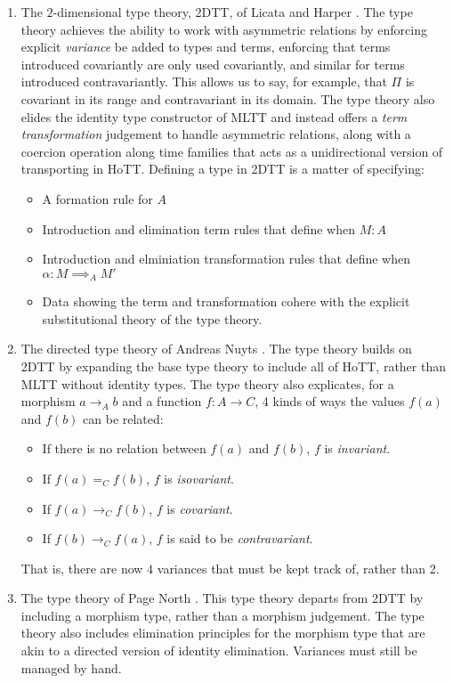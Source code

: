 \documentclass[main.tex]{subfiles}
\begin{document}
\begin{enumerate}
	\item The $2$-dimensional type theory, 2DTT, of Licata and Harper \cite{2DTT_Licata_Harper}. The type theory achieves the ability to work with asymmetric relations by enforcing explicit \textit{variance} be added to types and terms, enforcing that terms introduced covariantly are only used covariantly, and similar for terms introduced contravariantly. This allows us to say, for example, that $\Pi$ is covariant in its range and contravariant in its domain. The type theory also elides the identity type constructor of MLTT and instead offers a \textit{term transformation} judgement to handle asymmetric relations, along with a coercion operation along time families that acts as a unidirectional version of transporting in HoTT. Defining a type in 2DTT is a matter of specifying:
	\begin{itemize}
		\item A formation rule for $A$
		\item Introduction and elimination term rules that define when $M : A$
		\item Introduction and elminiation transformation rules that define when $\alpha : M \implies_A M'$
		\item Data showing the term and transformation cohere with the explicit substitutional theory of the type theory.
	\end{itemize}
	\item The directed type theory of Andreas Nuyts \cite{nuyts2015towards}. The type theory builds on 2DTT by expanding the base type theory to include all of HoTT, rather than MLTT without identity types. The type theory also explicates, for a morphism $a \to_A b$ and a function $f : A \to C$, 4 kinds of ways the values $f(a)$ and $f(b)$ can be related:
	\begin{itemize}
		\item If there is no relation between $f(a)$ and $f(b)$, $f$ is \textit{invariant}.
		\item If $f(a)=_C f(b)$, $f$ is \textit{isovariant}.
		\item If $f(a) \to_C f(b)$, $f$ is \textit{covariant}. 
		\item If $f(b) \to_C f(a)$, $f$ is said to be \textit{contravariant}.
	\end{itemize}
	That is, there are now $4$ variances that must be kept track of, rather than 2. 
	\item The type theory of Page North \cite{north_towards_2019}. This type theory departs from 2DTT by including a morphism type, rather than a morphism judgement. The type theory also includes elimination principles for the morphism type that are akin to a directed version of identity elimination. Variances must still be managed by hand.
  \end{enumerate}
\end{document}

